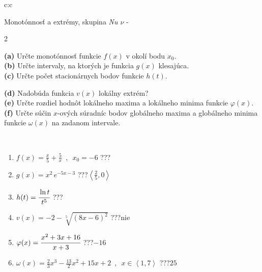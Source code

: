 \documentclass[10pt]{report}
\begin{document}
\newpage
\thispagestyle{empty}
\begin{tabular}{c:c}
\begin{minipage}[c][104.5mm][t]{0.5\linewidth}
\begin{center}
\vspace{7mm}
{\huge Monotónnosť a extrémy, skupina \textit{Nu $\nu$} -}\\[5mm]
\begin{minipage}{0.95\linewidth}
\begin{center}
{\small \begin{multicols}{2} \raggedright
\textbf{(a)} Určte monotónnosť funkcie \(f(x)\) v okolí bodu \(x_0\). \\[1mm]
\textbf{(b)} Určte intervaly, na ktorých je funkcia \(g(x)\) klesajúca. \\[1mm]
\textbf{(c)} Určte počet stacionárnych bodov funkcie \(h(t)\). \par \columnbreak
\textbf{(d)} Nadobúda funkcia \(v(x)\) lokálny extrém? \\[1mm]
\textbf{(e)} Určte rozdiel hodnôt lokálneho maxima a lokálneho minima funkcie \(\varphi(x)\). \\[1mm]
\textbf{(f)} Určte súčin \(x\)-ových súradníc bodov globálneho maxima a globálneho minima funkcie \(\omega(x)\) na zadanom intervale. \\[1mm]
\end{multicols}
}
\end{center}
\end{minipage}
\\[4mm]
\begin{minipage}{0.79\linewidth}
\begin{center}
\begin{varwidth}{\linewidth}
\begin{enumerate}
\normalsize
\item $f(x)=\frac{x}{5}+\frac{5}{x} \enspace , \enspace x_0=-6$\quad \dotfill\; ???\;\dotfill \quad {}
\item $g(x)=x^2\, e^{-5x-3}$\quad \dotfill\; ???\;\dotfill \quad $\left\langle\frac{2}{5} , 0\right\rangle$
\item $h(t)=\cfrac{\ln t}{t^5}$\quad \dotfill\; ???\;\dotfill {}
\item $v(x)=-2-\sqrt[5]{(8x-6)^2}$\quad \dotfill\; ???\;\dotfill \quad $\text{nie}$
\item $\varphi(x)=\cfrac{x^2+3x+16}{x+3}$\quad \dotfill\; ???\;\dotfill \quad $-16$
\item $\omega(x)=\frac{2}{3}x^3-\frac{13}{2}x^2+15x+2 \enspace , \enspace x\in\left\langle1 , 7\right\rangle$\quad \dotfill\; ???\;\dotfill \quad $25$

\end{enumerate}
\end{varwidth}
\end{center}
\end{minipage}
\end{center}
\end{minipage}
\end{tabular}
\end{document}
